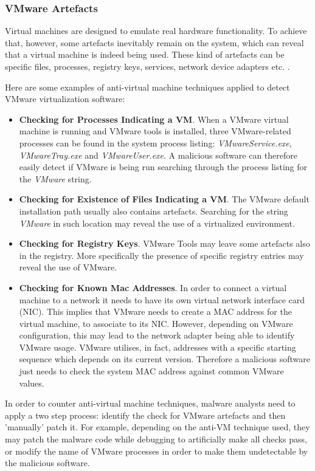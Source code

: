 \documentclass[pdfa%
,cucitura%
]{toptesi}
\begin{document}
\subsubsection{VMware Artefacts}
Virtual machines are designed to emulate real hardware functionality. To achieve that, however, some artefacts inevitably remain on the system, which can reveal that a virtual machine is indeed being used. These kind of artefacts can be specific files, processes, registry keys, services, network device adapters etc. \cite{SikorskiPMA}.

Here are some examples of anti-virtual machine techniques applied to detect VMware virtualization software:
\begin{itemize}
	\item \textbf{Checking for Processes Indicating a VM}.
	When a VMware virtual machine is running and VMware tools is installed, three VMware-related processes can be found in the system process listing: \textit{VMwareService.exe}, \textit{VMwareTray.exe} and \textit{VMwareUser.exe}. A malicious software can therefore easily detect if VMware is being run searching through the process listing for the \textit{VMware} string.
	
	\item \textbf{Checking for Existence of Files Indicating a VM}.
	The VMware default installation path usually also contains artefacts. Searching for the string \textit{VMware} in such location may reveal the use of a virtualized environment.
	
	\item \textbf{Checking for Registry Keys}.
	VMware Tools may leave some artefacts also in the registry. More specifically the presence of specific registry entries may reveal the use of VMware.
	
	\item \textbf{Checking for Known Mac Addresses}.
	In order to connect a virtual machine to a network it needs to have its own virtual network interface card (NIC). This implies that VMware needs to create a MAC address for the virtual machine, to associate to its NIC. However, depending on VMware configuration, this may lead to the network adapter being able to identify VMware usage. VMware utilises, in fact, addresses with a specific starting sequence which depends on its current version. Therefore a malicious software just needs to check the system MAC address against common VMware values.
\end{itemize}

In order to counter anti-virtual machine techniques, malware analysts need to apply a two step process: identify the check for VMware artefacts and then 'manually' patch it. For example, depending on the anti-VM technique used, they may patch the malware code while debugging to artificially make all checks pass, or modify the name of VMware processes in order to make them undetectable by the malicious software.
\end{document}

